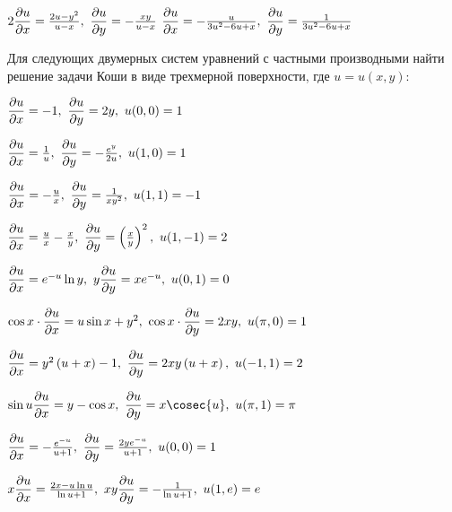 	\begin{enumtasks}

		\label{nonlinsys_partialsyst:systems2star}
		\itemstar \( 2\dfrac{\partial u}{\partial x} = \frac{2u - y^2}{u - x}, ~ \dfrac{\partial u}{\partial y} = -\frac{xy}{u - x} \) %
		\itemstar \( \dfrac{\partial u}{\partial x} = - \frac{u}{3 u^{2} - 6 u + x}, ~ \dfrac{\partial u}{\partial y} = \frac{1}{3 u^{2} - 6 u + x} \) %

	\end{enumtasks}

	Для следующих двумерных систем уравнений с частными производными найти решение задачи Коши в виде трехмерной поверхности, где $u = u(x, y)$:

	\begin{multicols}{2}
		\begin{enumtasks}

			\label{nonlinsys_partialsyst:systems2cauchy}
			\item \( \dfrac{\partial u}{\partial x} = -1, ~ \dfrac{\partial u}{\partial y} = 2 y, ~ u(0, 0) = 1 \) %
			\item \( \dfrac{\partial u}{\partial x} = \frac{1}{u}, ~ \dfrac{\partial u}{\partial y} = - \frac{e^y}{2u}, ~ u(1, 0) = 1 \) %
			\item \( \dfrac{\partial u}{\partial x} = - \frac{u}{x}, ~ \dfrac{\partial u}{\partial y} = \frac{1}{x y^2}, ~ u(1, 1) = -1 \) %
			\item \( \dfrac{\partial u}{\partial x} = \frac{u}{x} - \frac{x}{y}, ~ \dfrac{\partial u}{\partial y} = \left( \frac{x}{y} \right)^2, ~ u(1, -1) = 2 \) %
		
		\end{enumtasks}
	\end{multicols}

	\begin{enumtasks}

		\label{nonlinsys_partialsyst:systems2cauchy_hard}
		\item \(  \dfrac{\partial u}{\partial x} = e^{-u} \ln{y}, ~ y\dfrac{\partial u}{\partial y} = x e^{-u}, ~ u(0, 1) = 0 \) %
		\item \(  \cos{x} \cdot \dfrac{\partial u}{\partial x} = u \sin{x} + y^2, ~ \cos{x} \cdot \dfrac{\partial u}{\partial y} = 2 x y, ~ u(\pi, 0) = 1 \) %
		\item \(  \dfrac{\partial u}{\partial x} = y^2 \left( u + x \right) - 1, ~ \dfrac{\partial u}{\partial y} = 2xy \left( u + x \right), ~ u(-1, 1) = 2 \) %
		\item \(  \sin{u} \dpart{u}{x} = y - \cos{x}, ~ \dpart{u}{y} = x \cosec{u}, ~ u(\pi, 1) = \pi \) %
		\item \(  \dfrac{\partial u}{\partial x} = - \frac{e^{-u}}{u + 1}, ~ \dfrac{\partial u}{\partial y} = \frac{2 y e^{-u}}{u + 1}, ~ u(0, 0) = 1 \) %
		\item \(  x\dfrac{\partial u}{\partial x} = \frac{2x - u \ln{u}}{\ln{u} + 1}, ~ xy \dfrac{\partial u}{\partial y} = - \frac{1}{\ln{u} + 1}, ~ u(1, e) = e \) %
		
	\end{enumtasks}

